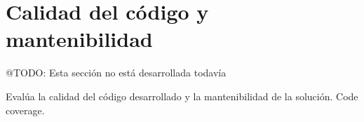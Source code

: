 \section{Calidad del código y mantenibilidad}

\colorbox{color_highlight}{@TODO: Esta sección no está desarrollada todavía}

Evalúa la calidad del código desarrollado y la mantenibilidad de la solución.
Code coverage.